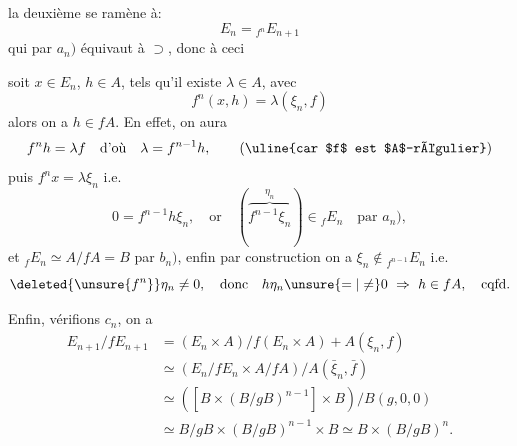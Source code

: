 la deuxième  se ramène à:
\[
E_n={}_{f^n}E_{n+1}
\]
qui par $a_n)$ équivaut à $\supset$, donc à ceci

soit $x\in E_n$, $h\in A$,  tels qu'il existe $\lambda\in A$, avec
\[
f^n(x,h)=\lambda(\xi_n,f)
\]
alors on a $h\in fA$. En effet, on aura
\[
f^nh=\lambda f\quad\text{d'où}\quad\lambda=f^{n-1}h,
\qquad(\text{\uline{car $f$ est $A$-régulier}})
\]
puis $f^nx=\lambda\xi_n$  i.e.
\[
0=f^{n-1}h\xi_n,\quad\text{or}\quad
(\overbrace{f^{n-1}\xi_n}^{\eta_n})\in{}_fE_n\quad\text{par }a_n),
\]
 et ${}_fE_n\simeq A/fA=B$ par $b_n)$, 
enfin par construction on a $\xi_n\notin{}_{f^{n-1}}E_n$ i.e.
\[
\deleted{\unsure{f^n}}\eta_n\ne0,\quad\text{donc}\quad
h\eta_n\unsure{=|\ne}0\ \Rightarrow\ h\in fA,\quad\text{cqfd.}
\]

Enfin, vérifions $c_n$, on a
\[
\begin{aligned}
E_{n+1}/fE_{n+1}
&=(E_n\times A)/f(E_n\times A)+A(\xi_n,f)\\
&\simeq(E_n/fE_n\times A/fA)/A(\bar\xi_n,\bar f)\\
&\simeq([B\times(B/gB)^{n-1}]\times B)/B(g,0,0)\\
&\simeq B/gB\times(B/gB)^{n-1}\times B\simeq B\times(B/gB)^n.
\end{aligned}
\]

